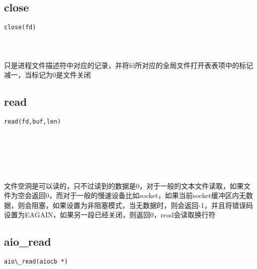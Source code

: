 \documentclass[10pt,a4paper]{article}
\begin{document}
\subsection{close}
\begin{spacing}{2.0}
\lstset{language=C,numbers=none}
\begin{lstlisting}
close(fd)
\end{lstlisting}
{\large\color[rgb]{0.2,0.4,0.6}{fd:}}
\paragraph{ \ \ }只是进程文件描述符中对应的记录，并将fd所对应的全局文件打开表表项中的标记减一，当标记为0是文件关闭
\end{spacing}

\subsection{read}
\begin{spacing}{2.0}
\lstset{language=C,numbers=none}
\begin{lstlisting}
read(fd,buf,len)
\end{lstlisting}
{\large\color[rgb]{0.2,0.4,0.6}{fd:}} \\
{\large\color[rgb]{0.2,0.4,0.6}{buf:}} \\
{\large\color[rgb]{0.2,0.4,0.6}{len:}}
\paragraph{ \ \ }文件空洞是可以读的，只不过读到的数据是0，对于一般的文本文件读取，如果文件为空会返回0，而对于一般的慢速设备比如socket，如果当前socket缓冲区内无数据，则会阻塞，如果设置为非阻塞模式，当无数据时，则会返回-1，并且将错误码设置为EAGAIN，如果另一段已经关闭，则返回0，read会读取换行符
\end{spacing}

\subsection{aio\_read}
\begin{spacing}{2.0}
\lstset{language=C,numbers=none}
\begin{lstlisting}
aio\_read(aiocb *)
\end{lstlisting}
{\large\color[rgb]{0.2,0.4,0.6}{*:}}
\paragraph{ \ \ }
\end{spacing}
\end{document}
